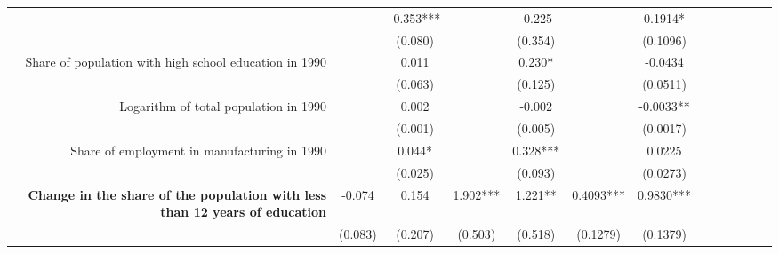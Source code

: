 \begin{frame}
\begin{table}[ht]
{\begin{tabular}{rcccccccccccc}
                    &             & -0.353***     &             & -0.225        &                & 0.1914*        \\
                    &             & \small(0.080) &             & \small(0.354) &                & \small(0.1096) \\
    
    Share of population with high school education in 1990                      
    
                    &             & 0.011         &             & 0.230*        &                & -0.0434        \\
                    &             & \small(0.063) &             & \small(0.125) &                & \small(0.0511) \\
    
    Logarithm of total population in 1990                        
    
                    &             & 0.002        &             & -0.002         &                & -0.0033**      \\
                    &             & \small(0.001) &             & \small(0.005) &                & \small(0.0017) \\
    
    Share of employment in manufacturing in 1990                 
    
                    &             & 0.044*       &             & 0.328***       &                & 0.0225         \\
                    &             & \small(0.025) &             & \small(0.093) &                & \small(0.0273) \\
     
                \cmidrule(lr){2-3} \cmidrule(lr){4-5} \cmidrule(lr){6-7}
    
     \bf{Change in the share of the population with less than 12 years of education}
    
                    & -0.074       & 0.154       & 1.902***    & 1.221**            & 0.4093***      & 0.9830***      \\
                    & \small(0.083) & \small(0.207) & \small(0.503) & \small(0.518) & \small(0.1279) & \small(0.1379) \\
                \bottomrule
                \end{tabular}
            }
            \vspace{0.2cm}
            

\end{table}
\end{frame}
